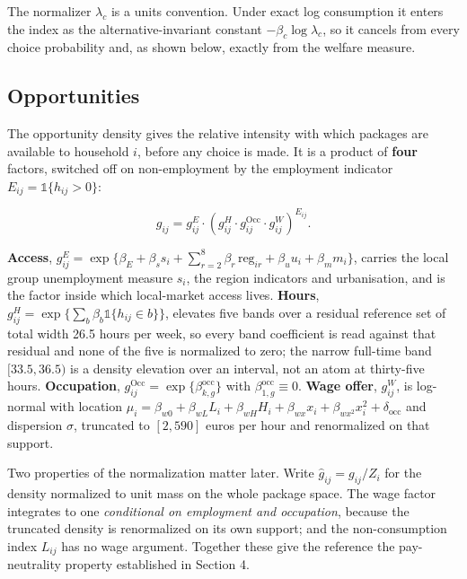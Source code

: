 The normalizer \(\lambda_c\) is a units convention. Under exact log consumption it enters the index as the alternative-invariant constant \(-\beta_c\log\lambda_c\), so it cancels from every choice probability and, as shown below, exactly from the welfare measure.

\subsection{Opportunities}\label{opportunities}

The opportunity density gives the relative intensity with which packages are available to household \(i\), before any choice is made. It is a product of \textbf{four} factors, switched off on non-employment by the employment indicator \(E_{ij}=\mathbb 1\{h_{ij}>0\}\):

\[
g_{ij}=g^{E}_{ij}\cdot\left(g^{H}_{ij}\cdot g^{\mathrm{Occ}}_{ij}\cdot g^{W}_{ij}\right)^{E_{ij}} .
\]

\textbf{Access}, \(g^{E}_{ij}=\exp\{\beta_E+\beta_s s_i+\sum_{r=2}^{8}\beta_r\,\mathrm{reg}_{ir}+\beta_u u_i+\beta_m m_i\}\), carries the local group unemployment measure \(s_i\), the region indicators and urbanisation, and is the factor inside which local-market access lives. \textbf{Hours}, \(g^{H}_{ij}=\exp\{\sum_b \beta_b\mathbb 1\{h_{ij}\in b\}\}\), elevates five bands over a residual reference set of total width 26.5 hours per week, so every band coefficient is read against that residual and none of the five is normalized to zero; the narrow full-time band \([33.5,36.5)\) is a density elevation over an interval, not an atom at thirty-five hours. \textbf{Occupation}, \(g^{\mathrm{Occ}}_{ij}=\exp\{\beta^{\mathrm{occ}}_{k,g}\}\) with \(\beta^{\mathrm{occ}}_{1,g}\equiv 0\). \textbf{Wage offer}, \(g^{W}_{ij}\), is log-normal with location \(\mu_i=\beta_{w0}+\beta_{wL}L_i+\beta_{wH}H_i+\beta_{wx}x_i+\beta_{wx^{2}}x_i^{2}+\delta_{\mathrm{occ}}\) and dispersion \(\sigma\), truncated to \([2,590]\) euros per hour and renormalized on that support.

Two properties of the normalization matter later. Write \(\widehat g_{ij}=g_{ij}/Z_i\) for the density normalized to unit mass on the whole package space. The wage factor integrates to one \emph{conditional on employment and occupation}, because the truncated density is renormalized on its own support; and the non-consumption index \(L_{ij}\) has no wage argument. Together these give the reference the pay-neutrality property established in Section 4.

